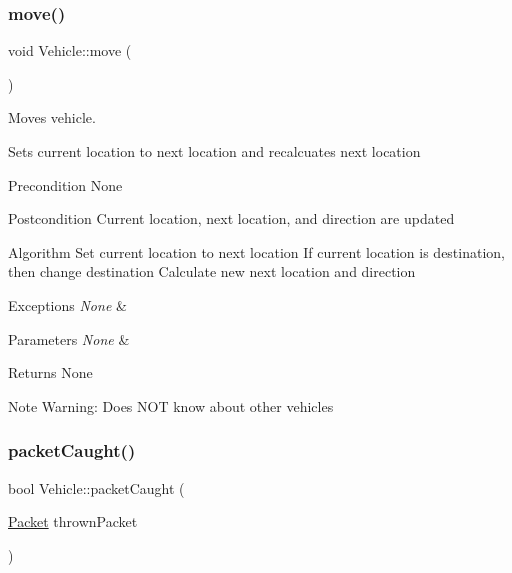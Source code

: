\hypertarget{class_vehicle_a257dd3b4dd777389bffea92476c2971a}{}\label{class_vehicle_a257dd3b4dd777389bffea92476c2971a} 
\subsubsection{\texorpdfstring{move()}{move()}}
{\footnotesize\ttfamily void Vehicle\+::move (\begin{DoxyParamCaption}{ }\end{DoxyParamCaption})}



Moves vehicle. 

Sets current location to next location and recalcuates next location

\begin{DoxyPrecond}{Precondition}
None
\end{DoxyPrecond}
\begin{DoxyPostcond}{Postcondition}
Current location, next location, and direction are updated
\end{DoxyPostcond}
\begin{DoxyParagraph}{Algorithm}
Set current location to next location If current location is destination, then change destination Calculate new next location and direction
\end{DoxyParagraph}

\begin{DoxyExceptions}{Exceptions}
{\em None} & \\
\hline
\end{DoxyExceptions}

\begin{DoxyParams}{Parameters}
{\em None} & \\
\hline
\end{DoxyParams}
\begin{DoxyReturn}{Returns}
None
\end{DoxyReturn}
\begin{DoxyNote}{Note}
Warning\+: Does N\+OT know about other vehicles 
\end{DoxyNote}
\hypertarget{class_vehicle_ab1af997092319d762ccbeda3bf6853c0}{}\label{class_vehicle_ab1af997092319d762ccbeda3bf6853c0} 
\subsubsection{\texorpdfstring{packet\+Caught()}{packetCaught()}}
{\footnotesize\ttfamily bool Vehicle\+::packet\+Caught (\begin{DoxyParamCaption}\item[{\hyperlink{struct_packet}{Packet}}]{thrown\+Packet }\end{DoxyParamCaption})}




